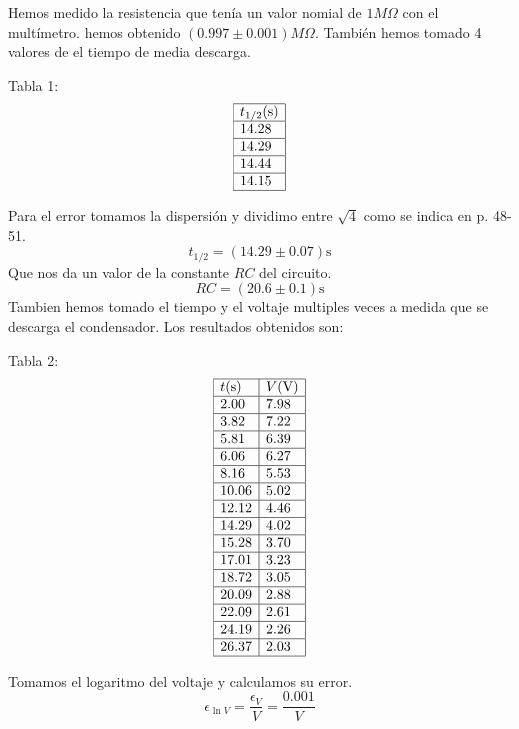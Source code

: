 \documentclass{article}
\begin{document}
\begin{multicols}{2}
\begin{center}
\end{center}
Hemos medido la resistencia que tenía un valor nomial de $1M\Omega$ con el multímetro. hemos obtenido $(0.997\pm 0.001)M\Omega$. También hemos tomado 4 valores de el tiempo de media descarga.
\begin{center}
Tabla 1:
$$
\begin{array}{|l|l|}\hline
  t_{1/2} \text{(s)} \\ \hline
  14.28 \\ \hline
  14.29 \\ \hline
  14.44 \\ \hline
  14.15 \\ \hline
\end{array}
$$
\end{center}
Para el error tomamos la dispersión y dividimo entre $\sqrt{4}$ como se indica en \cite{manual} p. 48-51.
$$
t_{1/2} = (14.29 \pm 0.07) \text{s}
$$
Que nos da un valor de la constante $RC$ del circuito.
$$
RC = (20.6 \pm 0.1) \text{s}
$$
Tambien hemos tomado el tiempo y el voltaje multiples veces a medida que se descarga el condensador. Los resultados obtenidos son:
\begin{center}
  Tabla 2:
  $$
  \begin{array}{|l|l|} \hline
    t\text{(s)} & V\text{(V)} \\ \hline
    2.00  & 7.98  \\ \hline
    3.82  & 7.22  \\ \hline
    5.81  & 6.39  \\ \hline
    6.06  & 6.27  \\ \hline
    8.16  & 5.53  \\ \hline
    10.06 & 5.02  \\ \hline
    12.12 & 4.46  \\ \hline
    14.29 & 4.02  \\ \hline
    15.28 & 3.70  \\ \hline
    17.01 & 3.23  \\ \hline
    18.72 & 3.05  \\ \hline
    20.09 & 2.88  \\ \hline
    22.09 & 2.61  \\ \hline
    24.19 & 2.26  \\ \hline
    26.37 & 2.03  \\ \hline
    \end{array}
  $$
\end{center}
Tomamos el logaritmo del voltaje y calculamos su error.
$$
\epsilon_{\ln V} = \frac{\epsilon_V}{V} = \frac{0.001}{V} 
$$
\end{multicols}
\end{document}
